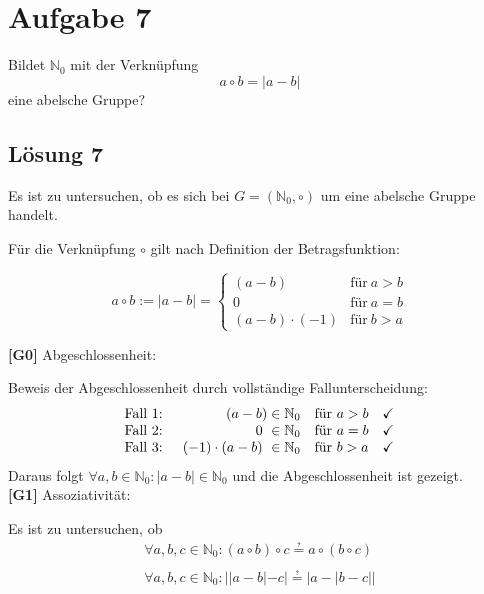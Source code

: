 \documentclass[main.tex]{subfiles}
\begin{document}
\section{Aufgabe 7}

Bildet $\mathbb{N}_0$ mit der Verknüpfung
\begin{equation*}
    a \circ b = \left| a-b \right|
\end{equation*}
eine abelsche Gruppe?

\subsection{Lösung 7}

Es ist zu untersuchen, ob es sich bei $G=(\mathbb{N}_{0},\circ )$ um eine abelsche Gruppe handelt. 

Für die Verknüpfung $\circ $ gilt nach Definition der Betragsfunktion:

\begin{equation*}
    a\circ b:=| a-b| = 
    \begin{cases}
        ( a-b)              & \text{für} \ a>b \\
            0               & \text{für} \ a=b \\
        ( a-b) \cdotp ( -1) & \text{für} \ b >a
    \end{cases}
\end{equation*}



\textbf{[G0]} Abgeschlossenheit: 

Beweis der Abgeschlossenheit durch vollständige Fallunterscheidung:
\begin{equation*}
    \begin{array}{ c r l c }
        \text{Fall 1: } & ( a-b) \in \mathbb{N}_{0} & \text{für} \ a >b & \checked \\
        \text{Fall 2: } & 0\ \in \mathbb{N}_{0} & \text{für} \ a=b & \checked \\
        \text{Fall 3: } & ( -1) \cdotp ( a-b) \ \in \mathbb{N}_{0} & \text{für} \ b >a & \checked 
    \end{array}
\end{equation*}
Daraus folgt $\forall a,b\in \mathbb{N}_{0} :| a-b| \in \mathbb{N}_{0}$ und die Abgeschlossenheit ist gezeigt.\\

\textbf{[G1]} Assoziativität:

Es ist zu untersuchen, ob
\begin{gather*}
    \forall a,b,c\in \mathbb{N}_{0} :( a\circ b) \circ c\questeq a\circ ( b\circ c)\\
    \\
    \forall a,b,c\in \mathbb{N}_{0} :| | a-b| -c| \questeq | a-| b-c| | 
\end{gather*}
\end{document}
